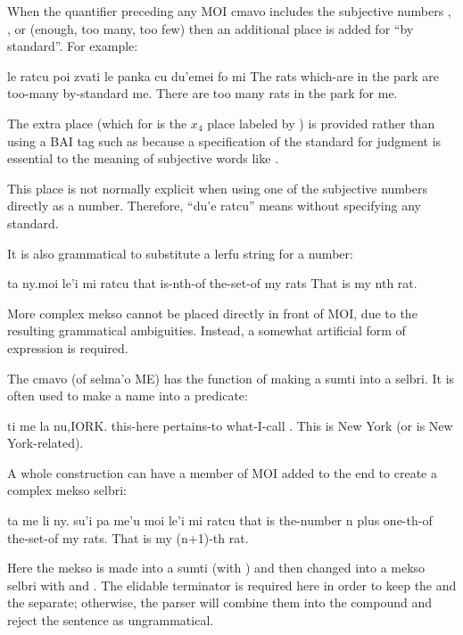 When the quantifier preceding any MOI cmavo includes the
    subjective numbers , , or  (enough, too
    many, too few) then an additional place is added for ``by
    standard''. For example:
\begin{example}
le ratcu poi zvati le panka cu du'emei fo mi\n
The rats which-are in the park are too-many\n
\T	by-standard me.\n
There are too many rats in the park for me.
\end{example}

The extra place (which for  is the $x_4$ place labeled by
    ) is provided rather than using a BAI tag such as
     because a specification of the standard for judgment
    is essential to the meaning of subjective words like
    . 

This place is not normally explicit when using one of the
    subjective numbers directly as a number. Therefore, ``du'e
    ratcu'' means  without specifying any
    standard.

It is also grammatical to substitute a lerfu string for a
    number:
\begin{example}
ta ny.moi le'i mi ratcu\n
that is-nth-of the-set-of my rats\n
That is my nth rat.
\end{example}

More complex mekso cannot be placed directly in front of MOI,
    due to the resulting grammatical ambiguities. Instead, a
    somewhat artificial form of expression is required. 

The cmavo  (of selma'o ME) has the function of making
    a sumti into a selbri. It is often used to make a name into a
    predicate:
\begin{example}
ti me la nu,IORK. \n
this-here pertains-to what-I-call .\n
This is New York (or is New York-related).
\end{example}

A whole  construction can have a member of MOI added to
    the end to create a complex mekso selbri:
\begin{example}
ta me li ny. su'i pa me'u moi le'i mi ratcu\n
that is the-number n plus one-th-of the-set-of my rats.\n
That is my (n+1)-th rat.
\end{example}

Here the mekso  is made into a sumti (with
    ) and then changed into a mekso selbri with  and
    . The elidable terminator  is required here
    in order to keep the  and the  separate;
    otherwise, the parser will combine them into the compound
     and reject the sentence as ungrammatical.


